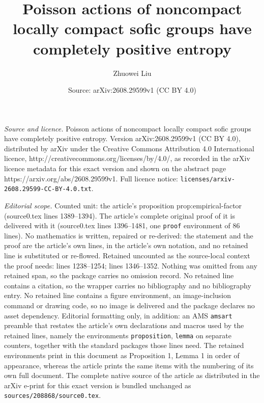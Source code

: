 \documentclass[10pt,a4paper]{amsart}
\title{Poisson actions of noncompact locally compact sofic groups have completely positive entropy}
\author{Zhuowei Liu}
\date{Source: arXiv:2608.29599v1 (CC BY 4.0)}
\begin{document}
\maketitle

\noindent\emph{Source and licence.} Poisson actions of noncompact locally compact sofic groups have completely positive entropy. Version arXiv:2608.29599v1 (CC BY 4.0), distributed by arXiv under the Creative Commons Attribution 4.0 International licence, http://creativecommons.org/licenses/by/4.0/, as recorded in the arXiv licence metadata for this exact version and shown on the abstract page https://arxiv.org/abs/2608.29599v1. Full licence notice: \texttt{licenses/arxiv-2608.29599-CC-BY-4.0.txt}.\par\smallskip

\noindent\textit{Editorial scope.} Counted unit: the article's proposition prop:empirical-factor (source0.tex lines 1389--1394). The article's complete original proof of it is delivered with it (source0.tex lines 1396--1481, one \texttt{proof} environment of 86 lines). No mathematics is written, repaired or re-derived: the statement and the proof are the article's own lines, in the article's own notation, and no retained line is substituted or re-flowed.  Retained uncounted as the source-local context the proof needs: lines 1238--1254; lines 1346--1352.  Nothing was omitted from any retained span, so the package carries no omission record.  No retained line contains a citation, so the wrapper carries no bibliography and no bibliography entry.  No retained line contains a figure environment, an image-inclusion command or drawing code, so no image is delivered and the package declares no asset dependency.  Editorial formatting only, in addition: an AMS \texttt{amsart} preamble that restates the article's own declarations and macros used by the retained lines, namely the environments \texttt{proposition}, \texttt{lemma} on separate counters, together with the standard packages those lines need.  The retained environments print in this document as Proposition 1, Lemma 1 in order of appearance, whereas the article prints the same items with the numbering of its own full document.  The complete native source of the article as distributed in the arXiv e-print for this exact version is bundled unchanged as \texttt{sources/208868/source0.tex}.
\end{document}
